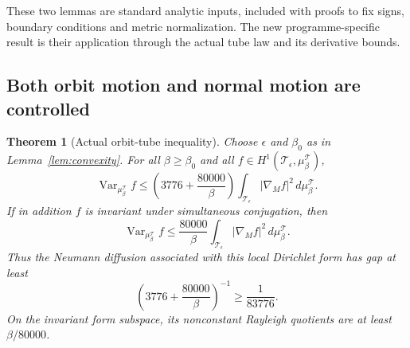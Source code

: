 \documentclass[11pt,oneside]{article}
\newtheorem{theorem}{Theorem}[section]
\DeclareMathOperator{\Var}{Var}
\newcommand{\cT}{\mathcal T}
\begin{document}
These two lemmas are standard analytic inputs,
included with proofs to fix signs, boundary
conditions and metric normalization. The
new programme-specific result is their
application through the actual tube law
and its derivative bounds.

\subsection{Both orbit motion and normal motion are controlled}

\begin{theorem}[Actual orbit-tube inequality]
\label{thm:tube}
Choose \(\epsilon\) and \(\beta_0\) as in
Lemma~\ref{lem:convexity}. For all
\(\beta\ge\beta_0\) and all
\(f\in H^1(\cT_\epsilon,\mu_\beta^{\cT})\),
\[
 \Var_{\mu_\beta^{\cT}}f
 \le \left(3776+\frac{80000}{\beta}\right)
          \int_{\cT_\epsilon}|\nabla_Mf|^2\,d\mu_\beta^{\cT}.
 \tag{4.4}
\]
If in addition \(f\) is invariant under
simultaneous conjugation, then
\[
 \Var_{\mu_\beta^{\cT}}f
 \le\frac{80000}{\beta}
          \int_{\cT_\epsilon}|\nabla_Mf|^2\,d\mu_\beta^{\cT}.
 \tag{4.5}
\]
Thus the Neumann diffusion associated with
this local Dirichlet form has gap at least
\[
 \left(3776+\frac{80000}{\beta}\right)^{-1}
                               \ge\frac1{83776}.
 \tag{4.6}
\]
On the invariant form subspace, its nonconstant
Rayleigh quotients are at least \(\beta/80000\).
\end{theorem}
\end{document}
